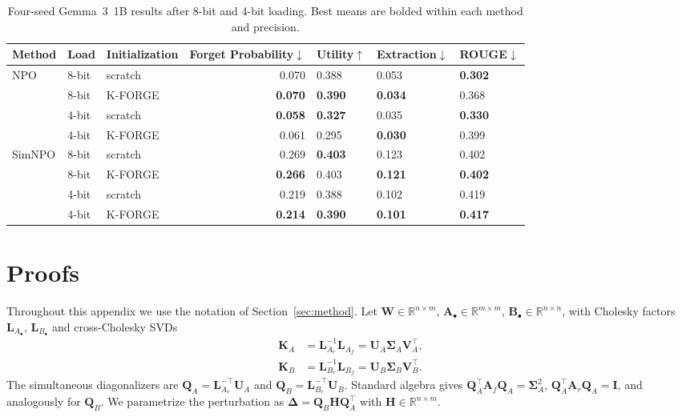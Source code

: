 \documentclass[11pt]{article}
\begin{document}
{\begin{table}[htbp!]
\centering
\small
\setlength{\tabcolsep}{4pt}
\begin{tabular}{lllrlll}
\toprule
\textbf{Method} & \textbf{Load} & \textbf{Initialization} & \textbf{Forget Probability}$\downarrow$ & \textbf{Utility}$\uparrow$ & \textbf{Extraction}$\downarrow$ & \textbf{ROUGE}$\downarrow$ \\
\midrule
\multirow{4}{*}{NPO}
 & 8-bit & scratch & 0.070 & 0.388 & 0.053 & \textbf{0.302} \\
 & 8-bit & K-FORGE & \textbf{0.070} & \textbf{0.390} & \textbf{0.034} & 0.368 \\
 & 4-bit & scratch & \textbf{0.058} & \textbf{0.327} & 0.035 & \textbf{0.330} \\
 & 4-bit & K-FORGE & 0.061 & 0.295 & \textbf{0.030} & 0.399 \\
\midrule
\multirow{4}{*}{SimNPO}
 & 8-bit & scratch & 0.269 & \textbf{0.403} & 0.123 & 0.402 \\
 & 8-bit & K-FORGE & \textbf{0.266} & 0.403 & \textbf{0.121} & \textbf{0.402} \\
 & 4-bit & scratch & 0.219 & 0.388 & 0.102 & 0.419 \\
 & 4-bit & K-FORGE & \textbf{0.214} & \textbf{0.390} & \textbf{0.101} & \textbf{0.417} \\
\bottomrule
\end{tabular}
\caption{Four-seed Gemma~3~1B results after 8-bit and 4-bit loading. Best means are bolded within each method and precision.}
\label{tab:gemma_quantization}
\end{table}

}

\appendix
\section{Proofs}
\label{sec:proofs}

Throughout this appendix we use the notation of Section~\ref{sec:method}. Let $\mathbf{W}\in\mathbb{R}^{n\times m}$, $\mathbf{A}_\bullet\in\mathbb{R}^{m\times m}$, $\mathbf{B}_\bullet\in\mathbb{R}^{n\times n}$, with Cholesky factors $\mathbf{L}_{A_\bullet}$, $\mathbf{L}_{B_\bullet}$ and cross-Cholesky SVDs
\begin{align*}
\mathbf{K}_A &= \mathbf{L}_{A_r}^{-1}\mathbf{L}_{A_f} = \mathbf{U}_A\mathbf{\Sigma}_A\mathbf{V}_A^\top, \\
\mathbf{K}_B &= \mathbf{L}_{B_r}^{-1}\mathbf{L}_{B_f} = \mathbf{U}_B\mathbf{\Sigma}_B\mathbf{V}_B^\top.
\end{align*}
The simultaneous diagonalizers are $\mathbf{Q}_A = \mathbf{L}_{A_r}^{-\top}\mathbf{U}_A$ and $\mathbf{Q}_B = \mathbf{L}_{B_r}^{-\top}\mathbf{U}_B$. Standard algebra gives $\mathbf{Q}_A^\top\mathbf{A}_f\mathbf{Q}_A = \mathbf{\Sigma}_A^2$, $\mathbf{Q}_A^\top\mathbf{A}_r\mathbf{Q}_A = \mathbf{I}$, and analogously for $\mathbf{Q}_B$. We parametrize the perturbation as $\mathbf{\Delta} = \mathbf{Q}_B\mathbf{H}\mathbf{Q}_A^\top$ with $\mathbf{H}\in\mathbb{R}^{n\times m}$.
\end{document}
